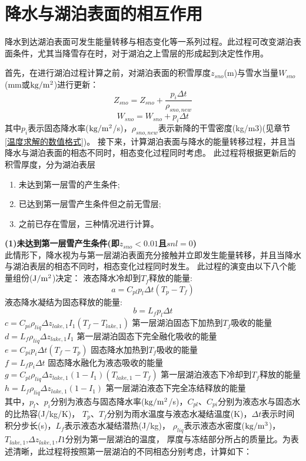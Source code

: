 \section{降水与湖泊表面的相互作用}
降水到达湖泊表面可发生能量转移与相态变化等一系列过程。此过程可改变湖泊表面条件，尤其当降雪存在时，对于湖泊之上雪层的形成起到决定性作用。


首先，在进行湖泊过程计算之前，对湖泊表面的积雪厚度$z_{sno}$(m)与雪水当量$W_{sno}$(mm或$\rm kg/m^2$)进行更新：
\begin{equation}
Z_{sno}=Z_{sno}+\frac{p_{i} \Delta t}{\rho_{sno,new}}
\end{equation}
\begin{equation}
W_{sno}=W_{sno}+p_{i} \Delta t
\end{equation}
其中$p_i$表示固态降水率($\rm kg/m^2$/s)，$\rho_{sno,new}$表示新降的干雪密度(kg/m3)(见章节  \ref{温度求解的数值格式})。
接下来，计算湖泊表面与降水的能量转移过程，并且当降水与湖泊表面的相态不同时，相态变化过程同时考虑。
此过程将根据更新后的积雪厚度，分为湖泊表层
\begin{enumerate}
    \item 未达到第一层雪的产生条件;
    \item 已达到第一层雪产生条件但之前无雪层;
    \item 之前已存在雪层，三种情况进行计算。
\end{enumerate}

\textbf {(1)未达到第一层雪产生条件(即$z_{sno}<0.01$且$snl=0$)}\\
此情形下，降水视为与第一层湖泊表面充分接触并立即发生能量转移，并且当降水与湖泊表层的相态不同时，相态变化过程同时发生。
此过程的演变由以下八个能量组份($\rm J/m^2$)决定：
液态降水冷却到$T_f$释放的能量:
\begin{equation}
a=C_{pl} p_{l} \Delta t\left(T_{p}-T_{f}\right)
\end{equation}
液态降水凝结为固态释放的能量:
\begin{equation}
b=L_{f} p_{l} \Delta t
\end{equation}
$c=C_{p i} \rho_{liq} \Delta z_{lake, 1} I_{1}\left(T_{f}-T_{lake, 1}\right)$ 第一层湖泊固态下加热到$T_f$吸收的能量\\
$d=L_{f} \rho_{liq} \Delta z_{lake, 1} I_{1}$ 第一层湖泊固态下完全融化吸收的能量\\
$e=C_{p i} p_{i} \Delta t\left(T_{f}-T_{p}\right)$ 固态降水加热到$T_f$吸收的能量\\
$f=L_{f} p_{i} \Delta t$ 固态降水融化为液态吸收的能量\\
$g=C_{pl} \rho_{liq} \Delta z_{lake, 1}\left(1-I_{1}\right)\left(T_{lake, 1}-T_{f}\right)$ 第一层湖泊液态下冷却到$T_f$释放的能量\\
$h=L_{f} \rho_{liq} \Delta z_{lake, 1}\left(1-I_{1}\right)$ 第一层湖泊液态下完全冻结释放的能量\\
其中，$p_l$、$p_i$分别为液态与固态降水率($\rm kg/m^2$/s)，$C_{pl}$、$C_{pi}$分别为液态水与固态水的比热容(J/kg/K)，
$T_p$、$T_f$分别为雨水温度与液态水凝结温度(K)，$\Delta t$表示时间积分步长(s)，$L_f$表示液态水凝结潜热(J/kg)，
$\rho_{liq}$表示液态水密度($\rm kg/m^3$)，$T_{lake,1}$,$\Delta z_{lake,1}$,$I1$分别为第一层湖泊的温度，
厚度与冻结部分所占的质量比。为表述清晰，此过程将按照第一层湖泊的不同相态分别考虑，计算如下：\\

